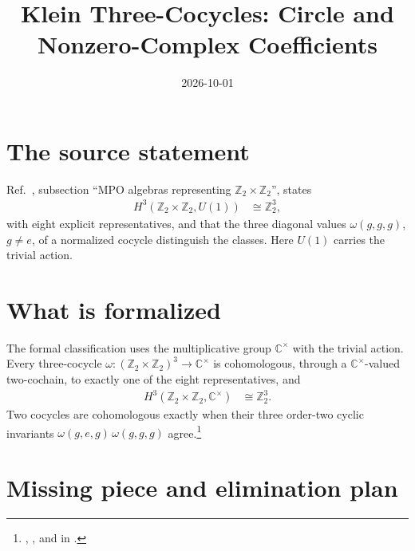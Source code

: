 \documentclass{article}
\title{Klein Three-Cocycles: Circle and Nonzero-Complex Coefficients}
\author{}
\date{2026-10-01}
\begin{document}
\maketitle
{}

\section{The source statement}

Ref.~\cite{GarreRubio2023MPOSym}, subsection ``MPO algebras representing
$\mathbb{Z}_2\times\mathbb{Z}_2$'', states
\begin{align}
    H^3(\mathbb{Z}_2\times\mathbb{Z}_2,U(1)) & \cong\mathbb{Z}_2^3,
    \label{eq:glm23kleinh3_source}
\end{align}
with eight explicit representatives, and that the three diagonal values
$\omega(g,g,g)$, $g\neq e$, of a normalized cocycle distinguish the classes.
Here $U(1)$ carries the trivial action.

\section{What is formalized}

The formal classification uses the multiplicative group $\mathbb{C}^\times$
with the trivial action. Every three-cocycle
$\omega:(\mathbb{Z}_2\times\mathbb{Z}_2)^3\to\mathbb{C}^\times$ is cohomologous,
through a $\mathbb{C}^\times$-valued two-cochain, to exactly one of the eight
representatives, and
\begin{align}
    H^3(\mathbb{Z}_2\times\mathbb{Z}_2,\mathbb{C}^\times) & \cong\mathbb{Z}_2^3.
    \label{eq:glm23kleinh3_complex}
\end{align}
Two cocycles are cohomologous exactly when their three order-two cyclic
invariants $\omega(g,e,g)\,\omega(g,g,g)$ agree.\footnote{
    ,
    ,
    and  in
    .}

\section{Missing piece and elimination plan}
\end{document}
